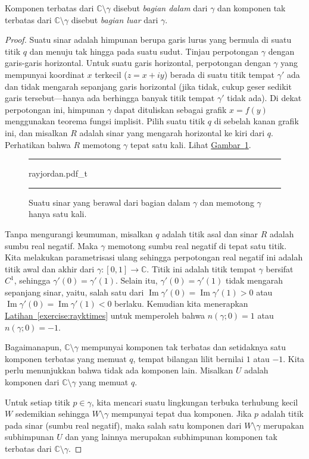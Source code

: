 \documentclass[12pt,openany]{book}
\renewcommand{\Im}{\operatorname{Im}}
\newcommand{\C}{{\mathbb{C}}}
\theoremstyle{plain}
\theoremstyle{remark}
\theoremstyle{definition}
\newenvironment{myfig}{%
\begin{figure}[h!t]
\noindent\rule{\textwidth}{0.5pt}\vspace{12pt}\par\centering}%
{\par\noindent\rule{\textwidth}{0.5pt}
\end{figure}}
\theoremstyle{exercise}
\theoremstyle{example}
\newcommand{\figureref}[1]{\hyperref[#1]{Gambar~\ref*{#1}}}
\newcommand{\exerciseref}[1]{\hyperref[#1]{Latihan~\ref*{#1}}}
\begin{document}
Komponen terbatas dari $\C \setminus \gamma$ disebut
\emph{bagian dalam} dari $\gamma$
dan komponen tak terbatas dari $\C \setminus \gamma$ disebut
\emph{bagian luar} dari $\gamma$.

\begin{proof}
Suatu sinar adalah himpunan berupa garis lurus yang bermula di suatu titik $q$
dan menuju tak hingga pada suatu sudut.
Tinjau
perpotongan $\gamma$ dengan garis-garis horizontal. Untuk suatu garis horizontal,
perpotongan dengan $\gamma$ yang mempunyai koordinat $x$ terkecil ($z=x+iy$)
berada di suatu titik tempat $\gamma'$ ada dan tidak mengarah sepanjang
garis horizontal (jika tidak,
cukup geser sedikit garis tersebut---hanya ada berhingga banyak titik tempat
$\gamma'$ tidak ada). Di dekat perpotongan ini, himpunan $\gamma$
dapat dituliskan sebagai grafik $x=f(y)$ menggunakan teorema fungsi implisit.
Pilih suatu titik $q$ di sebelah kanan grafik ini, dan misalkan $R$ adalah
sinar yang mengarah horizontal ke kiri dari $q$. Perhatikan bahwa $R$ memotong $\gamma$ tepat
satu kali.
Lihat \figureref{fig:rayjordan}.
\begin{myfig}
{rayjordan.pdf_t}
\caption{Suatu sinar yang berawal dari bagian dalam $\gamma$ dan memotong $\gamma$
hanya satu kali.\label{fig:rayjordan}}
\end{myfig}

Tanpa mengurangi keumuman, misalkan $q$ adalah titik asal dan
sinar $R$ adalah sumbu real negatif. Maka $\gamma$ memotong sumbu
real negatif di tepat satu titik.
Kita melakukan parametrisasi ulang sehingga perpotongan real negatif ini
adalah titik awal dan akhir dari $\gamma \colon [0,1] \to \C$. Titik ini
adalah titik tempat $\gamma$ bersifat $C^1$, sehingga $\gamma'(0) =
\gamma'(1)$. Selain itu, $\gamma'(0) = \gamma'(1)$ tidak mengarah sepanjang sinar,
yaitu, salah satu dari
$\Im \gamma'(0) = \Im \gamma'(1) > 0$ atau
$\Im \gamma'(0) = \Im \gamma'(1) < 0$ berlaku.
Kemudian kita menerapkan
\exerciseref{exercise:rayktimes} untuk memperoleh bahwa $n(\gamma;0) = 1$ atau
$n(\gamma;0) = -1$.

Bagaimanapun, $\C \setminus \gamma$ mempunyai komponen tak terbatas
dan setidaknya satu komponen terbatas yang memuat $q$,
tempat bilangan lilit bernilai $1$ atau $-1$. Kita
perlu menunjukkan bahwa tidak ada komponen lain. Misalkan $U$ adalah komponen dari $\C
\setminus \gamma$ yang memuat $q$.

Untuk setiap titik $p \in \gamma$, kita mencari suatu lingkungan terbuka terhubung kecil
$W$ sedemikian sehingga $W \setminus \gamma$ mempunyai tepat dua komponen.
Jika $p$ adalah titik pada sinar (sumbu real negatif), maka salah satu
komponen dari $W \setminus \gamma$ merupakan subhimpunan $U$ dan yang lainnya merupakan
subhimpunan komponen tak terbatas dari $\C \setminus \gamma$.


\end{proof}
\end{document}
